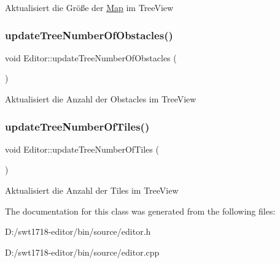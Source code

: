 Aktualisiert die Größe der \mbox{\hyperlink{class_map}{Map}} im Tree\+View \mbox{\label{class_editor_ab6a95acaa882cf1184e5fee306bf0d60}} 
\subsubsection{\texorpdfstring{update\+Tree\+Number\+Of\+Obstacles()}{updateTreeNumberOfObstacles()}}
{\footnotesize\ttfamily void Editor\+::update\+Tree\+Number\+Of\+Obstacles (\begin{DoxyParamCaption}{ }\end{DoxyParamCaption})}

Aktualisiert die Anzahl der Obstacles im Tree\+View \mbox{\label{class_editor_a64370ff1f5ceddcb1e261f2360ca1f82}} 
\subsubsection{\texorpdfstring{update\+Tree\+Number\+Of\+Tiles()}{updateTreeNumberOfTiles()}}
{\footnotesize\ttfamily void Editor\+::update\+Tree\+Number\+Of\+Tiles (\begin{DoxyParamCaption}{ }\end{DoxyParamCaption})}

Aktualisiert die Anzahl der Tiles im Tree\+View 

The documentation for this class was generated from the following files\+:\begin{DoxyCompactItemize}
\item 
D\+:/swt1718-\/editor/bin/source/editor.\+h\item 
D\+:/swt1718-\/editor/bin/source/editor.\+cpp\end{DoxyCompactItemize}
